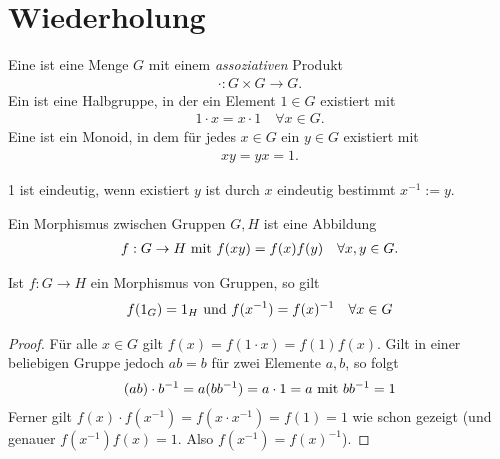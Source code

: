 ﻿\section{Wiederholung}
\begin{definition}
	Eine  ist eine Menge $G$ mit einem \emph{assoziativen} Produkt
	\begin{align*}
		\cdot\colon G \times G \to G.
	\end{align*}
	Ein  ist eine Halbgruppe, in der ein Element $1 \in G$ existiert mit 
	\begin{align*}
		1\cdot x = x\cdot 1 \quad\forall x \in G.
	\end{align*}
	Eine  ist ein Monoid, in dem für jedes $x \in G$ ein $y \in G$ existiert mit
	\begin{align*}
		xy = yx = 1.
	\end{align*}
\end{definition}
\begin{remark} %
		1 ist eindeutig, wenn existiert $y$ ist durch $x$ eindeutig bestimmt $x^{-1} :=y$. %
\end{remark}
\begin{definition}[Morphismus]
	Ein Morphismus zwischen Gruppen $G,H$ ist eine Abbildung
	\begin{align*}
		f: G \to H \mit f(xy) = f(x)f(y) \quad\forall x,y \in G.
	\end{align*}
\end{definition}
\begin{proposition}
	Ist $f: G \to H$ ein Morphismus von Gruppen, so gilt
	\begin{align*}
		f(1_G) = 1_H \und f(x^{-1}) = f(x)^{-1} \quad \forall x \in G
	\end{align*}
\end{proposition}
\begin{proof}
	Für alle $x \in G$ gilt $f(x) = f(1\cdot x) = f(1)f(x)$. Gilt in einer beliebigen Gruppe jedoch $ab=b$ für zwei Elemente $a,b$, so folgt %
	\begin{align*}
		(ab)\cdot b^{-1} = a(bb^{-1}) = a\cdot 1 = a \mit bb^{-1} = 1
	\end{align*}
	Ferner gilt $f(x)\cdot f(x^{-1}) = f(x \cdot x^{-1}) = f(1) = 1$ wie schon gezeigt (und genauer $f(x^{-1})f(x) = 1$. Also $f(x^{-1}) = f(x)^{-1}$).
\end{proof}
